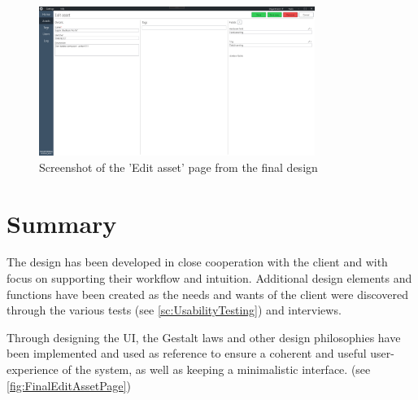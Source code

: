 \begin{figure}[H]
    \centering
    \includegraphics[width=0.8\textwidth]{figures/PicturesOfTheSystem/FinalEditAssetPage.png}
    \caption{Screenshot of the 'Edit asset' page from the final design}
    \label{fig:FinalEditAssetPage}
\end{figure}

\section{Summary}
The design has been developed in close cooperation with the client and with focus on supporting their workflow and intuition. Additional design elements and functions have been created as the needs and wants of the client were discovered through the various tests (see \autoref{sc:UsabilityTesting}) and interviews.
\par
Through designing the UI, the Gestalt laws and other design philosophies have been implemented and used as reference to ensure a coherent and useful user-experience of the system, as well as keeping a minimalistic interface. (see \autoref{fig:FinalEditAssetPage})